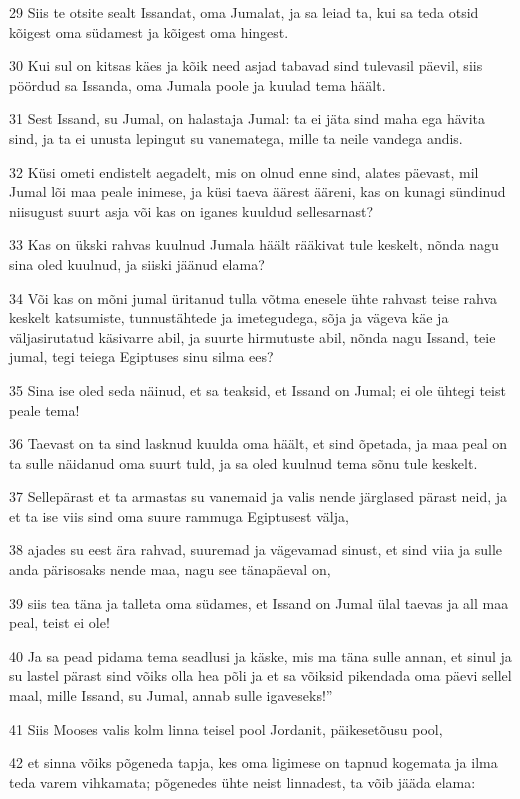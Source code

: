 \par 29 Siis te otsite sealt Issandat, oma Jumalat, ja sa leiad ta, kui sa teda otsid kõigest oma südamest ja kõigest oma hingest.
\par 30 Kui sul on kitsas käes ja kõik need asjad tabavad sind tulevasil päevil, siis pöördud sa Issanda, oma Jumala poole ja kuulad tema häält.
\par 31 Sest Issand, su Jumal, on halastaja Jumal: ta ei jäta sind maha ega hävita sind, ja ta ei unusta lepingut su vanematega, mille ta neile vandega andis.
\par 32 Küsi ometi endistelt aegadelt, mis on olnud enne sind, alates päevast, mil Jumal lõi maa peale inimese, ja küsi taeva äärest ääreni, kas on kunagi sündinud niisugust suurt asja või kas on iganes kuuldud sellesarnast?
\par 33 Kas on ükski rahvas kuulnud Jumala häält rääkivat tule keskelt, nõnda nagu sina oled kuulnud, ja siiski jäänud elama?
\par 34 Või kas on mõni jumal üritanud tulla võtma enesele ühte rahvast teise rahva keskelt katsumiste, tunnustähtede ja imetegudega, sõja ja vägeva käe ja väljasirutatud käsivarre abil, ja suurte hirmutuste abil, nõnda nagu Issand, teie jumal, tegi teiega Egiptuses sinu silma ees?
\par 35 Sina ise oled seda näinud, et sa teaksid, et Issand on Jumal; ei ole ühtegi teist peale tema!
\par 36 Taevast on ta sind lasknud kuulda oma häält, et sind õpetada, ja maa peal on ta sulle näidanud oma suurt tuld, ja sa oled kuulnud tema sõnu tule keskelt.
\par 37 Sellepärast et ta armastas su vanemaid ja valis nende järglased pärast neid, ja et ta ise viis sind oma suure rammuga Egiptusest välja,
\par 38 ajades su eest ära rahvad, suuremad ja vägevamad sinust, et sind viia ja sulle anda pärisosaks nende maa, nagu see tänapäeval on,
\par 39 siis tea täna ja talleta oma südames, et Issand on Jumal ülal taevas ja all maa peal, teist ei ole!
\par 40 Ja sa pead pidama tema seadlusi ja käske, mis ma täna sulle annan, et sinul ja su lastel pärast sind võiks olla hea põli ja et sa võiksid pikendada oma päevi sellel maal, mille Issand, su Jumal, annab sulle igaveseks!”
\par 41 Siis Mooses valis kolm linna teisel pool Jordanit, päikesetõusu pool,
\par 42 et sinna võiks põgeneda tapja, kes oma ligimese on tapnud kogemata ja ilma teda varem vihkamata; põgenedes ühte neist linnadest, ta võib jääda elama:
